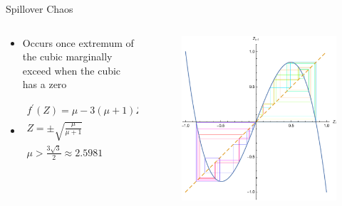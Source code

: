 \documentclass{beamer}
\begin{document}
\begin{frame}{Spillover Chaos}
	\begin{columns}
		\begin{column}{0.5\textwidth}
			\begin{itemize}
				\item
					Occurs once extremum of the cubic marginally exceed when the cubic has a zero

				\item
					\begin{gather*}
						f^\prime(Z)=\mu-3(\mu+1)Z^2=0\\
						Z=\pm\sqrt{\frac{\mu}{\mu+1}}\\
						\mu>\frac{3\sqrt{3}}{2}\approx2.5981
					\end{gather*}
			\end{itemize}
		\end{column}

		\begin{column}{0.5\textwidth}
			\begin{figure}
				\centering
				\includegraphics[width=\textwidth]{spillover_chaos.pdf}
			\end{figure}
		\end{column}
	\end{columns}
\end{frame}
\end{document}
